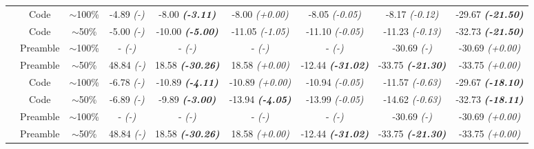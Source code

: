 \begin{tabular}{@{}ccccccccc@{}}
\midrule
{}

& Code & $\sim$100\% & -4.89 \textit{(-)} & -8.00 \textit{\textbf{(-3.11)}} & -8.00 \textit{(+0.00)} & -8.05 \textit{(-0.05)} & -8.17 \textit{(-0.12)} & -29.67 \textit{\textbf{(-21.50)}} \\
& Code & $\sim$50\% & -5.00 \textit{(-)} & -10.00 \textit{\textbf{(-5.00)}} & -11.05 \textit{(-1.05)} & -11.10 \textit{(-0.05)} & -11.23 \textit{(-0.13)} & -32.73 \textit{\textbf{(-21.50)}}\\
& Preamble & $\sim$100\% & - \textit{(-)} & - \textit{(-)} & - \textit{(-)} & - \textit{(-)} & -30.69 \textit{(-)} & -30.69 \textit{(+0.00)} \\
& Preamble & $\sim$50\% & 48.84 \textit{(-)} & 18.58 \textit{\textbf{(-30.26)}} & 18.58 \textit{(+0.00)} & -12.44 \textit{\textbf{(-31.02)}} & -33.75 \textit{\textbf{(-21.30)}} & -33.75 \textit{(+0.00)}\\

\midrule
{}

& Code & $\sim$100\% & -6.78 \textit{(-)} & -10.89 \textit{\textbf{(-4.11)}} & -10.89 \textit{(+0.00)} & -10.94 \textit{(-0.05)} & -11.57 \textit{(-0.63)} & -29.67 \textit{\textbf{(-18.10)}} \\
& Code & $\sim$50\% & -6.89 \textit{(-)} & -9.89 \textit{\textbf{(-3.00)}} & -13.94 \textit{\textbf{(-4.05)}} & -13.99 \textit{(-0.05)} & -14.62 \textit{(-0.63)} & -32.73 \textit{\textbf{(-18.11)}}\\
& Preamble & $\sim$100\% & - \textit{(-)} & - \textit{(-)} & - \textit{(-)} & - \textit{(-)} & -30.69 \textit{(-)} & -30.69 \textit{(+0.00)} \\
& Preamble & $\sim$50\% & 48.84 \textit{(-)} & 18.58 \textit{\textbf{(-30.26)}} & 18.58 \textit{(+0.00)} & -12.44 \textit{\textbf{(-31.02)}} & -33.75 \textit{\textbf{(-21.30)}} & -33.75 \textit{(+0.00)}\\

\bottomrule
\end{tabular}

